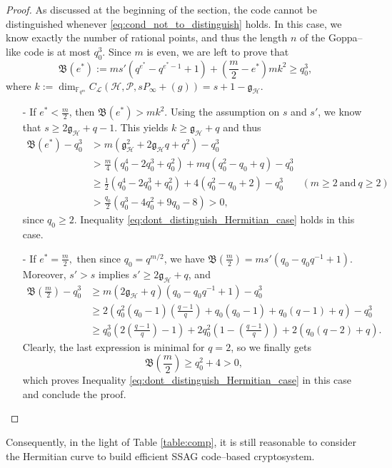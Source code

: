 \documentclass[a4paper]{amsart}
\theoremstyle{definition}
\theoremstyle{remark}
\newcommand{\calP}{\mathcal{P}}
\newcommand{\calH}{\mathcal{H}}
\newcommand{\fqm}{\mathbb{F}_{q^m}}
\begin{document}
\begin{proof}
    As discussed at the beginning of the section, the code cannot be distinguished whenever \eqref{eq:cond_not_to_distinguish} holds. In this case, we know exactly the number of rational points, and thus the length $n$ of the Goppa--like code is at most $q_0^3$. Since $m$ is even, we are left to prove that 
    \begin{equation} \label{eq:dont_distinguish_Hermitian_case}
    \mathfrak{B}(e^*) := ms'(q^{e^*}-q^{e^*-1}+1) + \left( \frac{m}{2}-e^*\right)mk^2 \geq q_0^3,
    \end{equation}
    where $k  := \dim_{\fqm} C_{\mathcal{L}}(\calH, \calP, sP_\infty + (g)) = s+1-\mathfrak{g}_{\calH}$.
    \begin{itemize}
        \item [-] If $e^* < \frac{m}{2}$, then $\mathfrak{B}(e^*) > mk^2$. Using the assumption on $s$ and $s'$, we know that $s \geq 2\mathfrak{g}_{\calH}+q-1$. This yields $k \geq \mathfrak{g}_{\calH}+q$ and thus
        \begin{align*}
\mathfrak{B}(e^*) - q_0^3 
&> m(\mathfrak{g}_{\calH}^2+2\mathfrak{g}_{\calH}q+q^2)-q_0^3&\\
& > \frac{m}{4}(q_0^4-2q_0^3+q_0^2) + mq(q_0^2-q_0+q) -q_0^3 &\\
& \geq \frac{1}{2}(q_0^4-2q_0^3+q_0^2)+4(q_0^2-q_0+2)-q_0^3 \quad &(m\geq 2 \ \mathrm{and} \ q\geq 2)&\\
& > \frac{q_0}{2} (q_0^3-4q_0^2+9q_0-8) > 0,&
        \end{align*}
        since $q_0 \geq 2$. Inequality \eqref{eq:dont_distinguish_Hermitian_case} holds in this case.
        \item[-] If $e^* = \frac{m}{2},$ then since $q_0=q^{m/2}$, we have $\mathfrak{B}\left(\frac{m}{2}\right) = ms'(q_0-q_0q^{-1}+1)$. Moreover, $s'>s$ implies $s' \geq 2\mathfrak{g}_{\calH}+q$, and
        \begin{align*}
           \mathfrak{B}\left(\frac{m}{2}\right) - q_0^3 
           &\geq m(2\mathfrak{g}_{\calH}+q)(q_0-q_0q^{-1}+1)-q_0^3 \\ 
           &\geq 2\left(q_0^2(q_0-1)\left(\frac{q-1}{q}\right)+q_0(q_0-1)+q_0(q-1)+q\right)-q_0^3 \\
           & \geq q_0^3\left(2\left(\frac{q-1}{q}\right)-1\right) + 2q_0^2\left(1-\left(\frac{q-1}{q}\right)\right) + 2(q_0(q-2)+q).
        \end{align*}
        Clearly, the last expression is minimal for $q=2$, so we finally gets
        $$\mathfrak{B}\left(\frac{m}{2}\right) \geq q_0^2 + 4 >0,$$
        which proves Inequality \eqref{eq:dont_distinguish_Hermitian_case} in this case and conclude the proof.
    \end{itemize}
\end{proof}
Consequently, in the light of Table \ref{table:comp}, it is still reasonable to consider the Hermitian curve to build efficient SSAG code--based cryptosystem.
\end{document}

